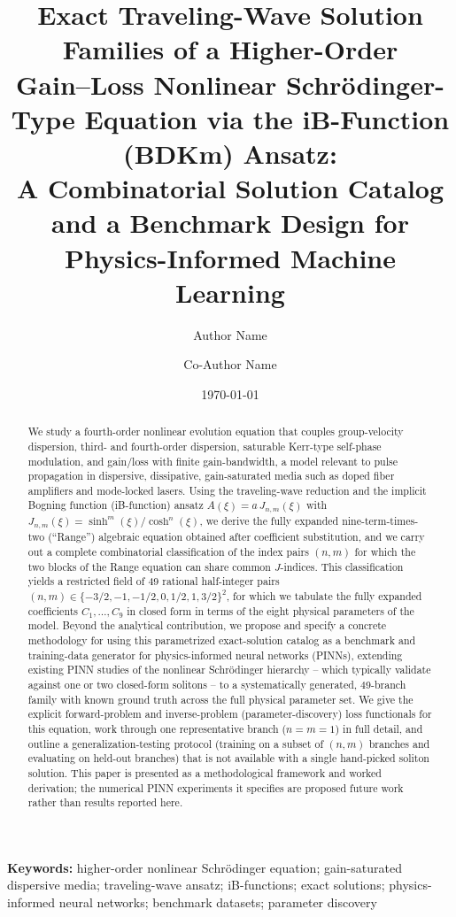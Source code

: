 \documentclass[11pt]{article}
\title{\textbf{Exact Traveling-Wave Solution Families of a Higher-Order \\
Gain--Loss Nonlinear Schr\"odinger-Type Equation via the iB-Function (BDKm) Ansatz: \\
A Combinatorial Solution Catalog and a Benchmark Design for \\
Physics-Informed Machine Learning}}
\author[1]{Author Name}
\author[1]{Co-Author Name}
\affil[1]{Department of Applied Mathematics / Photonics, Institution Name}
\date{\today}
\begin{document}
\maketitle

\begin{abstract}
We study a fourth-order nonlinear evolution equation that couples group-velocity
dispersion, third- and fourth-order dispersion, saturable Kerr-type self-phase
modulation, and gain/loss with finite gain-bandwidth, a model relevant to pulse
propagation in dispersive, dissipative, gain-saturated media such as doped fiber
amplifiers and mode-locked lasers. Using the traveling-wave reduction and the
implicit Bogning function (iB-function) ansatz $A(\xi)=a\,J_{n,m}(\xi)$ with
$J_{n,m}(\xi)=\sinh^m(\xi)/\cosh^n(\xi)$, we derive the fully expanded
nine-term-times-two (``Range'') algebraic equation obtained after coefficient
substitution, and we carry out a complete combinatorial classification of the
index pairs $(n,m)$ for which the two blocks of the Range equation can share
common $J$-indices. This classification yields a restricted field of 49 rational
half-integer pairs $(n,m)\in\{-3/2,-1,-1/2,0,1/2,1,3/2\}^2$, for which we tabulate
the fully expanded coefficients $C_1,\dots,C_9$ in closed form in terms of the
eight physical parameters of the model. Beyond the analytical contribution, we
propose and specify a concrete methodology for using this parametrized exact-solution
catalog as a benchmark and training-data generator for physics-informed neural
networks (PINNs), extending existing PINN studies of the nonlinear Schr\"odinger
hierarchy -- which typically validate against one or two closed-form solitons --
to a systematically generated, 49-branch family with known ground truth across the
full physical parameter set. We give the explicit forward-problem and
inverse-problem (parameter-discovery) loss functionals for this equation, work
through one representative branch ($n=m=1$) in full detail, and outline a
generalization-testing protocol (training on a subset of $(n,m)$ branches and
evaluating on held-out branches) that is not available with a single hand-picked
soliton solution. This paper is presented as a methodological framework and
worked derivation; the numerical PINN experiments it specifies are proposed future
work rather than results reported here.
\end{abstract}

\noindent\textbf{Keywords:} higher-order nonlinear Schr\"odinger equation; gain-saturated
dispersive media; traveling-wave ansatz; iB-functions; exact solutions; physics-informed
neural networks; benchmark datasets; parameter discovery
\end{document}
